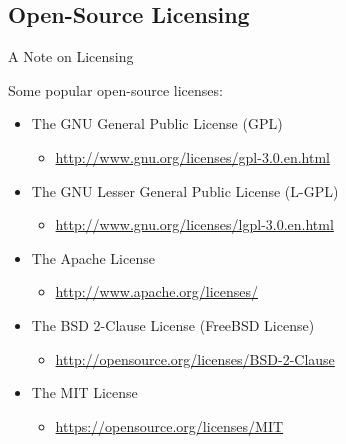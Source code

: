 \documentclass[10pt]{beamer}
\begin{document}

\subsection{Open-Source Licensing}


\begin{frame}{A Note on Licensing}

  Some popular open-source licenses:
  \vb
  \begin{itemize}
  \item The GNU General Public License (GPL)
    \begin{itemize}
    \item \url{http://www.gnu.org/licenses/gpl-3.0.en.html}
    \end{itemize}
    \vc
  \item The GNU Lesser General Public License (L-GPL)
    \begin{itemize}
    \item \url{http://www.gnu.org/licenses/lgpl-3.0.en.html}
    \end{itemize}
    \vc
  \item The Apache License
    \begin{itemize}
    \item \url{http://www.apache.org/licenses/}
    \end{itemize}
    \vc
  \item The BSD 2-Clause License (FreeBSD License)
    \begin{itemize}
    \item \url{http://opensource.org/licenses/BSD-2-Clause}
    \end{itemize}
    \vc
  \item The MIT License
    \begin{itemize}
    \item \url{https://opensource.org/licenses/MIT}
    \end{itemize}
  \end{itemize}

\end{frame}

\end{document}
